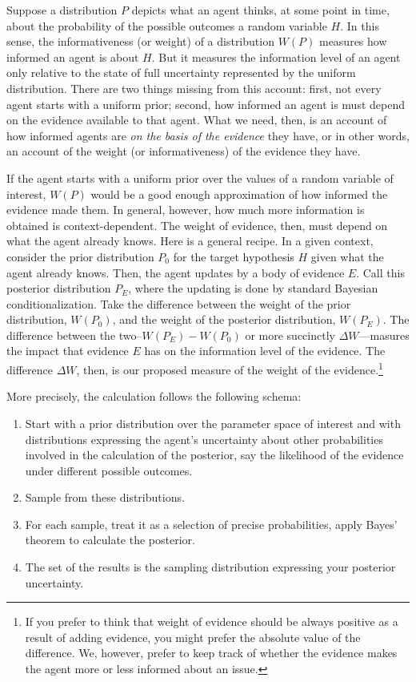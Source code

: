 \documentclass[
  10pt,
  dvipsnames,enabledeprecatedfontcommands]{scrartcl}
\begin{document}
Suppose a distribution \(P\) depicts what an agent thinks, at some point
in time, about the probability of the possible outcomes a random
variable \(H\). In this sense, the informativeness (or weight) of a
distribution \(W(P)\) measures how informed an agent is about \(H\). But
it measures the information level of an agent only relative to the state
of full uncertainty represented by the uniform distribution. There are
two things missing from this account: first, not every agent starts with
a uniform prior; second, how informed an agent is must depend on the
evidence available to that agent. What we need, then, is an account of
how informed agents are \textit{on the basis of the evidence} they have,
or in other words, an account of the weight (or informativeness) of the
evidence they have.

If the agent starts with a uniform prior over the values of a random
variable of interest, \(W(P)\) would be a good enough approximation of
how informed the evidence made them. In general, however, how much more
information is obtained is context-dependent. The weight of evidence,
then, must depend on what the agent already knows. Here is a general
recipe. In a given context, consider the prior distribution \(P_0\) for
the target hypothesis \(H\) given what the agent already knows. Then,
the agent updates by a body of evidence \(E\). Call this posterior
distribution \(P_E\), where the updating is done by standard Bayesian
conditionalization. Take the difference between the weight of the prior
distribution, \(W(P_0)\), and the weight of the posterior distribution,
\(W(P_E)\). The difference between the two--\(W(P_E)-W(P_0)\) or more
succinctly \(\Delta W\)---masures the impact that evidence \(E\) has on
the information level of the evidence. The difference \(\Delta W\),
then, is our proposed measure of the weight of the evidence.\footnote{If
  you prefer to think that weight of evidence should be always positive
  as a result of adding evidence, you might prefer the absolute value of
  the difference. We, however, prefer to keep track of whether the
  evidence makes the agent more or less informed about an issue.}

More precisely, the calculation follows the following schema:

\begin{enumerate}
\item Start with a prior distribution over the parameter space of interest and with distributions expressing the agent's uncertainty about other probabilities involved in the calculation of the posterior, say the likelihood of the evidence under different possible outcomes.
\item Sample from these distributions.
\item For each sample, treat it as a selection of precise probabilities, apply Bayes' theorem to calculate the posterior.
\item The set of the results is the sampling distribution expressing your posterior uncertainty.
\end{enumerate}
\end{document}
